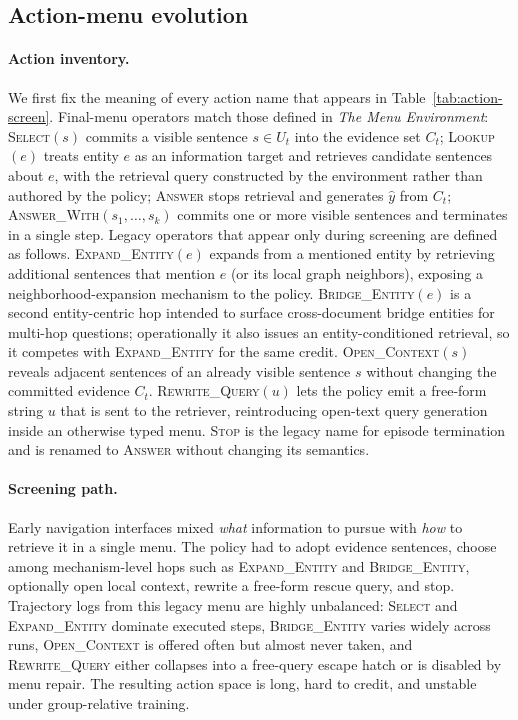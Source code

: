 \documentclass[letterpaper]{article} %
\begin{document}
\subsection{Action-menu evolution}
\label{app:action-menu}

\paragraph{Action inventory.}
We first fix the meaning of every action name that appears in Table~\ref{tab:action-screen}.
Final-menu operators match those defined in \emph{The Menu Environment}:
\textsc{Select}$(s)$ commits a visible sentence $s\in U_t$ into the evidence set $C_t$;
\textsc{Lookup}$(e)$ treats entity $e$ as an information target and retrieves candidate sentences about $e$, with the retrieval query constructed by the environment rather than authored by the policy;
\textsc{Answer} stops retrieval and generates $\hat y$ from $C_t$;
\textsc{Answer\_With}$(s_1,\ldots,s_k)$ commits one or more visible sentences and terminates in a single step.
Legacy operators that appear only during screening are defined as follows.
\textsc{Expand\_Entity}$(e)$ expands from a mentioned entity by retrieving additional sentences that mention $e$ (or its local graph neighbors), exposing a neighborhood-expansion mechanism to the policy.
\textsc{Bridge\_Entity}$(e)$ is a second entity-centric hop intended to surface cross-document bridge entities for multi-hop questions; operationally it also issues an entity-conditioned retrieval, so it competes with \textsc{Expand\_Entity} for the same credit.
\textsc{Open\_Context}$(s)$ reveals adjacent sentences of an already visible sentence $s$ without changing the committed evidence $C_t$.
\textsc{Rewrite\_Query}$(u)$ lets the policy emit a free-form string $u$ that is sent to the retriever, reintroducing open-text query generation inside an otherwise typed menu.
\textsc{Stop} is the legacy name for episode termination and is renamed to \textsc{Answer} without changing its semantics.

\paragraph{Screening path.}
Early navigation interfaces mixed \emph{what} information to pursue with \emph{how} to retrieve it in a single menu.
The policy had to adopt evidence sentences, choose among mechanism-level hops such as \textsc{Expand\_Entity} and \textsc{Bridge\_Entity}, optionally open local context, rewrite a free-form rescue query, and stop.
Trajectory logs from this legacy menu are highly unbalanced: \textsc{Select} and \textsc{Expand\_Entity} dominate executed steps, \textsc{Bridge\_Entity} varies widely across runs, \textsc{Open\_Context} is offered often but almost never taken, and \textsc{Rewrite\_Query} either collapses into a free-query escape hatch or is disabled by menu repair.
The resulting action space is long, hard to credit, and unstable under group-relative training.
\end{document}

